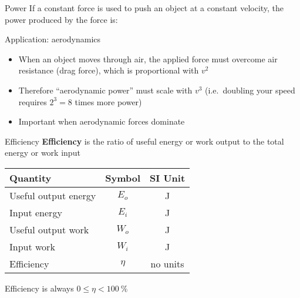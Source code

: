 \documentclass[12pt,compress,aspectratio=169]{beamer}
\begin{document}
\begin{frame}{Power}
  If a constant force is used to push an object at a constant velocity, the
  power produced by the force is:
  
  
  Application: aerodynamics
  \begin{itemize}
  \item When an object moves through air, the applied force must overcome air
    resistance (drag force), which is proportional with $v^2$
    \item Therefore ``aerodynamic power'' must scale with $v^3$ (i.e.\ doubling
      your speed requires $2^3=8$ times more power)
    \item Important when aerodynamic forces dominate
  \end{itemize}
\end{frame}



\begin{frame}{Efficiency}
  \textbf{Efficiency} is the ratio of useful energy or work output to the total
  energy or work input

  \begin{center}
    \begin{tabular}{l|c|c}
      \rowcolor{pink}
      \textbf{Quantity} & \textbf{Symbol} & \textbf{SI Unit} \\ \hline
      Useful output energy & $E_o$  & \si\joule \\
      Input energy         & $E_i$  & \si\joule \\
      Useful output work   & $W_o$  & \si\joule \\
      Input work           & $W_i$  & \si\joule \\
      Efficiency           & $\eta$ & no units
    \end{tabular}
  \end{center}
  Efficiency is always $0\leq\eta<\SI{100}\percent$
\end{frame}
\end{document}
